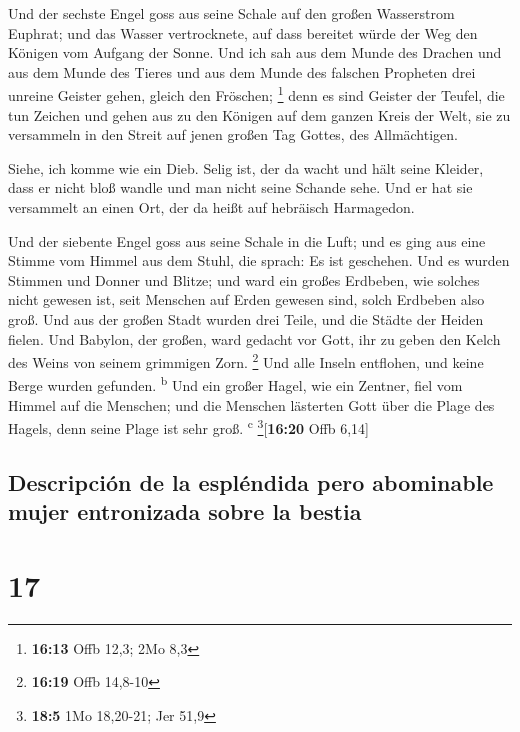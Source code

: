  Und der sechste Engel goss aus seine Schale auf den
großen Wasserstrom Euphrat; und das Wasser vertrocknete, auf dass
bereitet würde der Weg den Königen vom Aufgang der Sonne.
 Und ich sah aus dem Munde des Drachen und aus dem Munde
des Tieres und aus dem Munde des falschen Propheten drei unreine Geister
gehen, gleich den Fröschen; \footnote{\textbf{16:13} Offb 12,3; 2Mo 8,3}
 denn es sind Geister der Teufel, die tun Zeichen und
gehen aus zu den Königen auf dem ganzen Kreis der Welt, sie zu
versammeln in den Streit auf jenen großen Tag Gottes, des Allmächtigen.

 Siehe, ich komme wie ein Dieb. Selig ist, der da wacht
und hält seine Kleider, dass er nicht bloß wandle und man nicht seine
Schande sehe.  Und er hat sie versammelt an einen Ort,
der da heißt auf hebräisch Harmagedon.

 Und der siebente Engel goss aus seine Schale in die
Luft; und es ging aus eine Stimme vom Himmel aus dem Stuhl, die sprach:
Es ist geschehen.  Und es wurden Stimmen und Donner und
Blitze; und ward ein großes Erdbeben, wie solches nicht gewesen ist,
seit Menschen auf Erden gewesen sind, solch Erdbeben also groß.
 Und aus der großen Stadt wurden drei Teile, und die
Städte der Heiden fielen. Und Babylon, der großen, ward gedacht vor
Gott, ihr zu geben den Kelch des Weins von seinem grimmigen Zorn.
\footnote{\textbf{16:19} Offb 14,8-10}  Und alle Inseln
entflohen, und keine Berge wurden gefunden. \textsuperscript{b}
 Und ein großer Hagel, wie ein Zentner, fiel vom Himmel
auf die Menschen; und die Menschen lästerten Gott über die Plage des
Hagels, denn seine Plage ist sehr groß. \textsuperscript{c}
\footnote{\textbf{18:5} 1Mo 18,20-21; Jer 51,9}{[}\textbf{16:20} Offb
6,14{]}

\hypertarget{descripciuxf3n-de-la-espluxe9ndida-pero-abominable-mujer-entronizada-sobre-la-bestia}{%
\subsection{Descripción de la espléndida pero abominable mujer
entronizada sobre la
bestia}\label{descripciuxf3n-de-la-espluxe9ndida-pero-abominable-mujer-entronizada-sobre-la-bestia}}

\hypertarget{section-16}{%
\section{17}\label{section-16}}

